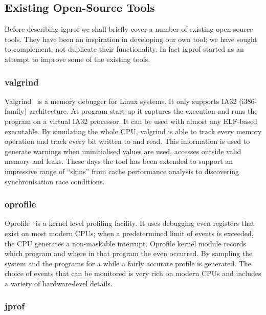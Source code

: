 \documentclass[10pt,a4paper,twocolumn]{article}
\begin{document}
\subsection{Existing Open-Source Tools}

Before describing igprof we shall briefly cover a number of existing
open-source tools.  They have been an inspiration in developing our
own tool; we have sought to complement, not duplicate their
functionality.  In fact igprof started as an attempt to improve some
of the existing tools.

\subsubsection{valgrind}

Valgrind~\cite{valgrind} is a memory debugger for Linux systems.  It
only supports IA32 (i386-family) architecture.  At program start-up it
captures the execution and runs the program on a virtual IA32
processor.  It can be used with almost any ELF-based executable.  By
simulating the whole CPU, valgrind is able to track every memory
operation and track every bit written to and read.  This information
is used to generate warnings when uninitialised values are used,
accesses outside valid memory and leaks.  These days the tool has been
extended to support an impressive range of ``skins'' from cache
performance analysis to discovering synchronisation race conditions.

\subsubsection{oprofile}

Oprofile~\cite{oprofile} is a kernel level profiling facility.  It
uses debugging even registers that exist on most modern CPUs; when a
predetermined limit of events is exceeded, the CPU generates a
non-maskable interrupt.  Oprofile kernel module records which program
and where in that program the even occurred.  By sampling the system
and the programs for a while a fairly accurate profile is generated.
The choice of events that can be monitored is very rich on modern
CPUs and includes a variety of hardware-level details.

\subsubsection{jprof}
\end{document}
